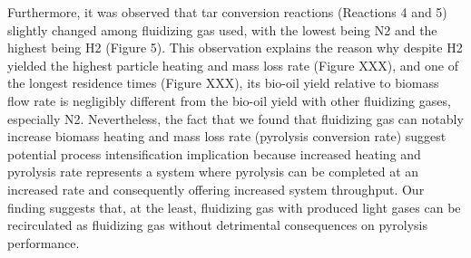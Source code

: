 Furthermore, it was observed that tar conversion reactions (Reactions 4 and 5) slightly changed among fluidizing gas used, with the lowest being N2 and the highest being H2 (Figure 5). This observation explains the reason why despite H2 yielded the highest particle heating and mass loss rate (Figure XXX), and one of the longest residence times (Figure XXX), its bio-oil yield relative to biomass flow rate is negligibly different from the bio-oil yield with other fluidizing gases, especially N2. Nevertheless, the fact that we found that fluidizing gas can notably increase biomass heating and mass loss rate (pyrolysis conversion rate) suggest potential process intensification implication because increased heating and pyrolysis rate represents a system where pyrolysis can be completed at an increased rate and consequently offering increased system throughput. Our finding suggests that, at the least, fluidizing gas with produced light gases can be recirculated as fluidizing gas without detrimental consequences on pyrolysis performance.

